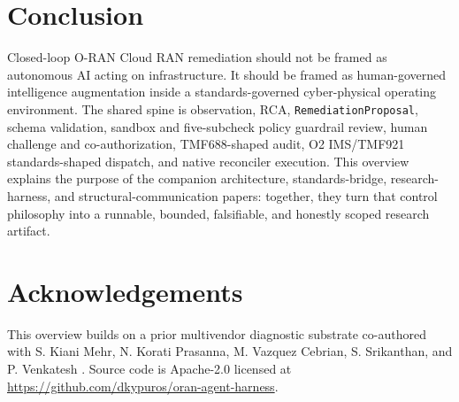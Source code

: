 \documentclass[twocolumn,10pt,a4paper]{article}
\begin{document}
\section{Conclusion}
\label{sec:conclude}

Closed-loop O-RAN Cloud RAN remediation should not be framed as autonomous AI acting on infrastructure. It should be framed as human-governed intelligence augmentation inside a standards-governed cyber-physical operating environment. The shared spine is observation, RCA, \texttt{RemediationProposal}, schema validation, sandbox and five-subcheck policy guardrail review, human challenge and co-authorization, TMF688-shaped audit, O2 IMS/TMF921 standards-shaped dispatch, and native reconciler execution. This overview explains the purpose of the companion architecture, standards-bridge, research-harness, and structural-communication papers: together, they turn that control philosophy into a runnable, bounded, falsifiable, and honestly scoped research artifact.

\section*{Acknowledgements}

This overview builds on a prior multivendor diagnostic substrate co-authored with S. Kiani Mehr, N. Korati Prasanna, M. Vazquez Cebrian, S. Srikanthan, and P. Venkatesh \cite{multivendor_blog_2026}. Source code is Apache-2.0 licensed at \url{https://github.com/dkypuros/oran-agent-harness}.



\end{document}
